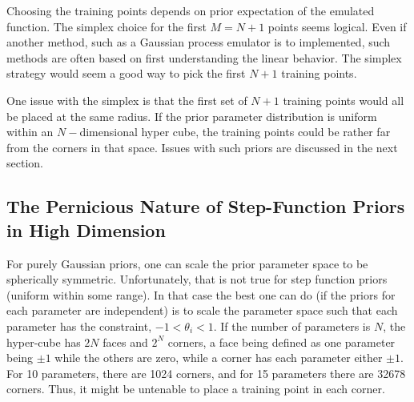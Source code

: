 \documentclass[main.tex]{subfiles}
\begin{document}
Choosing the training points depends on prior expectation of the emulated function. The simplex choice for the first $M=N+1$ points seems logical. Even if another method, such as a Gaussian process emulator is to implemented, such methods are often based on first understanding the linear behavior. The simplex strategy would seem a good way to pick the first $N+1$ training points.

One issue with the simplex is that the first set of $N+1$ training points would all be placed at the same radius. If the prior parameter distribution is uniform within an $N-$dimensional hyper cube, the training  points could be rather far from the corners in that space. Issues with such priors are discussed in the next section.

\subsection{The Pernicious Nature of Step-Function Priors in High Dimension}

For purely Gaussian priors, one can scale the prior parameter space to be spherically symmetric. Unfortunately, that is not true for step function priors (uniform within some range). In that case the best one can do (if the priors for each parameter are independent) is to scale the parameter space such that each parameter has the constraint, $-1<\theta_i<1$. If the number of parameters is $N$, the hyper-cube has $2N$ faces and $2^N$ corners, a face being defined as one parameter being $\pm 1$ while the others are zero, while a corner has each parameter either $\pm 1$. For 10 parameters, there are 1024 corners, and for 15 parameters there are 32678 corners. Thus, it might be untenable to place a training point in each corner. 
\end{document}
